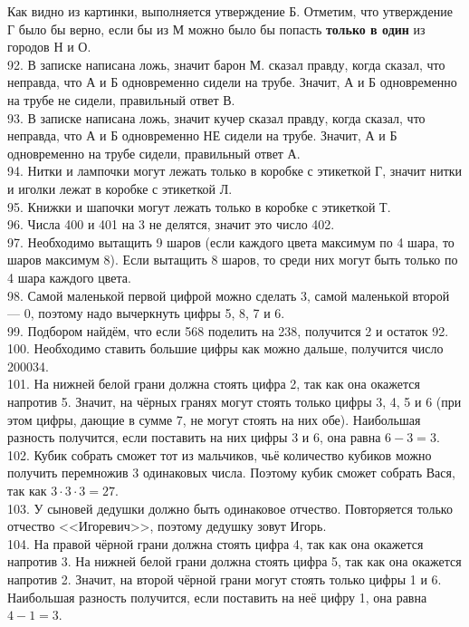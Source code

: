 \documentclass[12pt]{article}
\begin{document}
Как видно из картинки, выполняется утверждение Б. Отметим, что утверждение Г было бы верно, если бы из М можно было бы попасть {\bf только в один} из городов Н и О.\\
92. В записке написана ложь, значит барон М. сказал правду, когда сказал, что неправда, что А и Б одновременно сидели на трубе. Значит, А и Б одновременно на трубе не сидели, правильный ответ В.\\
93. В записке написана ложь, значит кучер сказал правду, когда сказал, что неправда, что А и Б одновременно НЕ сидели на трубе. Значит, А и Б одновременно на трубе сидели, правильный ответ А.\\
94. Нитки и лампочки могут лежать только в коробке с этикеткой Г, значит нитки и иголки лежат в коробке с этикеткой Л.\\
95. Книжки и шапочки могут лежать только в коробке с этикеткой Т.\\
96. Числа 400 и 401 на 3 не делятся, значит это число 402.\\
97. Необходимо вытащить 9 шаров (если каждого цвета максимум по 4 шара, то шаров максимум 8). Если вытащить 8 шаров, то среди них могут быть только по 4 шара каждого цвета.\\
98. Самой маленькой первой цифрой можно сделать 3, самой маленькой второй --- 0, поэтому надо вычеркнуть цифры 5, 8, 7 и 6.\\
99. Подбором найдём, что если 568 поделить на 238, получится 2 и остаток 92.\\
100. Необходимо ставить большие цифры как можно дальше, получится число 200034.\\
101. На нижней белой грани должна стоять цифра 2, так как она окажется напротив 5. Значит, на чёрных гранях могут стоять только цифры 3, 4, 5 и 6 (при этом цифры, дающие в сумме 7, не могут стоять на них обе). Наибольшая разность получится, если поставить на них цифры 3 и 6, она равна $6-3=3.$\\
102. Кубик собрать сможет тот из мальчиков, чьё количество кубиков можно получить перемножив 3 одинаковых числа. Поэтому кубик сможет собрать Вася, так как $3\cdot3\cdot3=27.$\\
103. У сыновей дедушки должно быть одинаковое отчество. Повторяется только отчество <<Игоревич>>, поэтому дедушку зовут Игорь.\\
104. На правой чёрной грани должна стоять цифра 4, так как она окажется напротив 3. На нижней белой грани должна стоять цифра 5, так как она окажется напротив 2. Значит, на второй чёрной грани могут стоять только цифры 1 и 6. Наибольшая разность получится, если поставить на неё цифру 1, она равна $4-1=3.$\\
\end{document}
